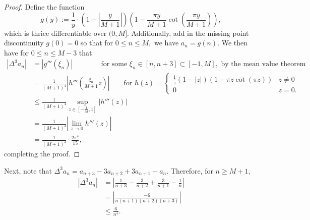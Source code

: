 \documentclass[11pt,letterpaper,reqno]{amsart}
\theoremstyle{definition}
\numberwithin{equation}{section}
\numberwithin{figure}{section}
\numberwithin{table}{section}
\begin{document}
\begin{proof}
    Define the function
    $$g(y) := \frac{1}{y} \cdot \left( 1 - \left| \frac{y}{M + 1}  \right| \right) \left( 1 - \frac{\pi y}{M + 1} \cot \left( \frac{\pi y}{M + 1}  \right)  \right),$$
    which is thrice differentiable over $(0, M].$ Additionally, add in the missing point discontinuity $g(0) = 0$
    so that for $0 \leq n \leq M,$ we have $a_n = g(n).$ We then have for $0 \leq n \leq M - 3$ that
    \begin{align}
        \left| \Delta^3 a_n  \right| &= \left| g'''(\xi_n) \right| \qquad \qquad \text{for some $\xi_n \in [n, n + 3] \subset [-1, M],$ by the mean value theorem} \\
        &= \frac{1}{(M+1)^4} \left| h'''\left(\frac{\xi_n}{M + 1} z\right) \right| \qquad \text{for $h(z) = \begin{cases}
        \frac{1}{z} \left(1 - |z| \right)  \left( 1 - \pi z \cot (\pi z)  \right) & z \neq 0\\
        0 & z = 0.
    \end{cases}$}\\
        &\leq \frac{1}{(M + 1)^4} \sup_{z \in \left[ -\frac{1}{M}, 1 \right]} \left| h'''(z) \right|\\
        &= \frac{1}{(M+1)^4} \left| \lim_{z \rightarrow 0} h'''(z) \right|\\\
        &= \frac{1}{(M+1)^4} \cdot \frac{2\pi^4}{15},
    \end{align}
    completing the proof.
\end{proof}

Next, note that $\Delta^3 a_n = a_{n + 3} - 3 a_{n + 2} + 3 a_{n + 1} - a_n.$ Therefore, for $n \geq M + 1,$
\begin{align}
    \left| \Delta^3 a_n \right| &= \left| \frac{1}{n + 3} - \frac{3}{n + 2} +\frac{3}{n + 1} - \frac{1}{n} \right|\\
    &=  \left| \frac{-6}{n(n + 1)(n + 2)(n + 3)} \right|\\
    &\leq \frac{6}{n^4}.
\end{align}
\end{document}
